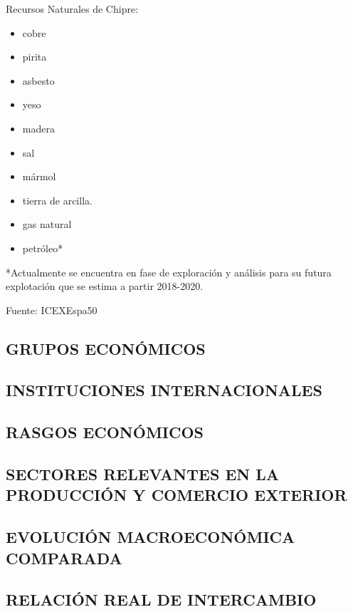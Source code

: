 \documentclass[11pt]{article}
\providecommand{\tightlist}{%
      \setlength{\itemsep}{0pt}\setlength{\parskip}{0pt}}
\begin{document}
Recursos Naturales de Chipre:

\begin{itemize}
\tightlist
\item
  cobre
\item
  pirita
\item
  asbesto
\item
  yeso
\item
  madera
\item
  sal
\item
  mármol
\item
  tierra de arcilla.
\item
  gas natural
\item
  petróleo*
\end{itemize}

*Actualmente se encuentra en fase de exploración y análisis para su
futura explotación que se estima a partir 2018-2020.

Fuente: ICEXEspa50

    \subsection{GRUPOS ECONÓMICOS}\label{grupos-econuxf3micos}

    \subsection{INSTITUCIONES
INTERNACIONALES}\label{instituciones-internacionales}

    \subsection{RASGOS ECONÓMICOS}\label{rasgos-econuxf3micos}

    \subsection{SECTORES RELEVANTES EN LA PRODUCCIÓN Y COMERCIO
EXTERIOR}\label{sectores-relevantes-en-la-producciuxf3n-y-comercio-exterior}

    \subsection{EVOLUCIÓN MACROECONÓMICA
COMPARADA}\label{evoluciuxf3n-macroeconuxf3mica-comparada}

    \subsection{RELACIÓN REAL DE
INTERCAMBIO}\label{relaciuxf3n-real-de-intercambio}
\end{document}
